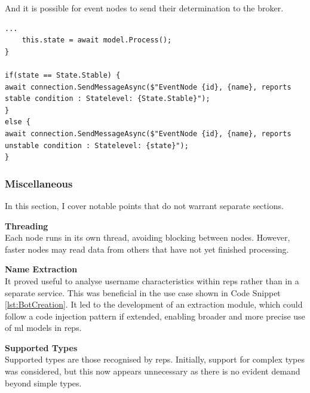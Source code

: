 		And it is possible for event nodes to send their determination to the broker.
		\begin{lstlisting}[language={[sharp]C},caption={EventNode.cs},label=lst:EventNodeSendMessage]
    ...   
    this.state = await model.Process();
}

if(state == State.Stable) {
await connection.SendMessageAsync($"EventNode {id}, {name}, reports stable condition : Statelevel: {State.Stable}");
}
else {
await connection.SendMessageAsync($"EventNode {id}, {name}, reports unstable condition : Statelevel: {state}");
}
		\end{lstlisting}
	\subsubsection{Miscellaneous}
	In this section, I cover notable points that do not warrant separate sections.
		
		\textbf{Threading}\\ \noindent
			Each node runs in its own thread, avoiding blocking between nodes. However, faster nodes may read data from others that have not yet finished processing.
		
		\textbf{Name Extraction}\\ \noindent
			It proved useful to analyse username characteristics within \gls{reps} rather than in a separate service. This was beneficial in the use case shown in Code Snippet \ref{lst:BotCreation}. It led to the development of an extraction module, which could follow a code injection pattern if extended, enabling broader and more precise use of \gls{ml} models in \gls{reps}.
			
		\textbf{Supported Types}\\ \noindent
			Supported types are those recognised by \gls{reps}. Initially, support for complex types was considered, but this now appears unnecessary as there is no evident demand beyond simple types.
	
